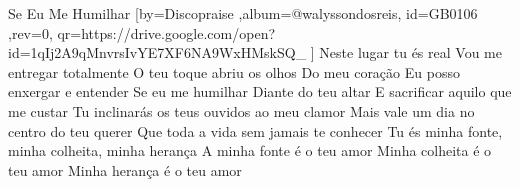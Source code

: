 \beginsong
{Se Eu Me Humilhar %
}[by={Discopraise %
},album={@walyssondosreis},
id={GB0106 %
},rev={0}, %
qr={https://drive.google.com/open?id=1qIj2A9qMnvrsIvYE7XF6NA9WxHMskSQ_ %
}]
\beginverse*
Neste lugar tu és real
Vou me entregar totalmente
O teu toque abriu os olhos
Do meu coração
Eu posso enxergar e entender
\endverse
\beginchorus
Se eu me humilhar
Diante do teu altar
E sacrificar aquilo que me custar
Tu inclinarás os teus ouvidos ao meu clamor
Mais vale um dia no centro do teu querer
Que toda a vida sem jamais te conhecer
Tu és minha fonte, minha colheita, minha herança
\endchorus
\beginverse*
A minha fonte é o teu amor
Minha colheita é o teu amor
Minha herança é o teu amor
\endverse



